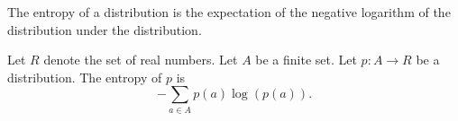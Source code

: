 
\sbasic
















\sstart
{}



The entropy of a distribution
is the
expectation of the negative
logarithm of the distribution
under the distribution.


Let $R$ denote the set of real numbers.
Let $A$ be a finite set.
Let $p:A \to R$ be a distribution.
The entropy of $p$ is
\[
  -\sum_{a \in A} p(a) \log(p(a)).
\]
\strats
